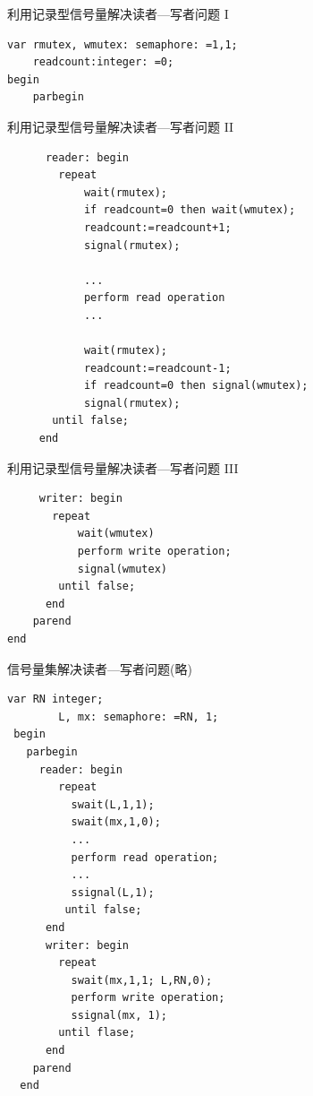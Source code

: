 \begin{frame}[fragile]{利用记录型信号量解决读者—写者问题 I}
\begin{verbatim}
var rmutex, wmutex: semaphore: =1,1;
    readcount:integer: =0;
begin
    parbegin
\end{verbatim}
\end{frame}

\begin{frame}[fragile]{利用记录型信号量解决读者—写者问题 II}
\begin{verbatim}
      reader: begin
        repeat
            wait(rmutex);
            if readcount=0 then wait(wmutex);
            readcount:=readcount+1;
            signal(rmutex);

            ...
            perform read operation
            ...

            wait(rmutex);
            readcount:=readcount-1;
            if readcount=0 then signal(wmutex);
            signal(rmutex);
       until false;
     end
\end{verbatim}


\end{frame}

\begin{frame}[fragile]{利用记录型信号量解决读者—写者问题 III}
\begin{verbatim}
     writer: begin
       repeat
           wait(wmutex)
           perform write operation;
           signal(wmutex)
        until false;
      end
    parend
end
\end{verbatim}
\end{frame}


\begin{frame}{信号量集解决读者—写者问题(略)}
\begin{verbatim}
var RN integer;
        L, mx: semaphore: =RN, 1;
 begin
   parbegin
     reader: begin
        repeat
          swait(L,1,1);
          swait(mx,1,0);
          ...
          perform read operation;
          ...
          ssignal(L,1);
         until false;
      end
      writer: begin
        repeat
          swait(mx,1,1; L,RN,0);
          perform write operation;
          ssignal(mx, 1);
        until flase;
      end
    parend
  end
\end{verbatim}
\end{frame}

